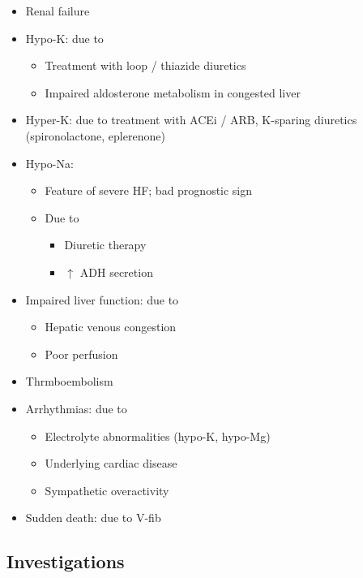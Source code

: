 \documentclass[
  12pt,
]{memoir}
\providecommand{\tightlist}{%
  \setlength{\itemsep}{0pt}\setlength{\parskip}{0pt}}
\begin{document}
\begin{itemize}
\tightlist
\item
  Renal failure
\item
  Hypo-K: due to

  \begin{itemize}
  \tightlist
  \item
    Treatment with loop / thiazide diuretics
  \item
    Impaired aldosterone metabolism in congested liver
  \end{itemize}
\item
  Hyper-K: due to treatment with ACEi / ARB, K-sparing diuretics
  (spironolactone, eplerenone)
\item
  Hypo-Na:

  \begin{itemize}
  \tightlist
  \item
    Feature of severe HF; bad prognostic sign
  \item
    Due to

    \begin{itemize}
    \tightlist
    \item
      Diuretic therapy
    \item
      \(\uparrow\) ADH secretion
    \end{itemize}
  \end{itemize}
\item
  Impaired liver function: due to

  \begin{itemize}
  \tightlist
  \item
    Hepatic venous congestion
  \item
    Poor perfusion
  \end{itemize}
\item
  Thrmboembolism
\item
  Arrhythmias: due to

  \begin{itemize}
  \tightlist
  \item
    Electrolyte abnormalities (hypo-K, hypo-Mg)
  \item
    Underlying cardiac disease
  \item
    Sympathetic overactivity
  \end{itemize}
\item
  Sudden death: due to V-fib
\end{itemize}

\hypertarget{investigations-1}{%
\subsection{Investigations}\label{investigations-1}}
\end{document}
